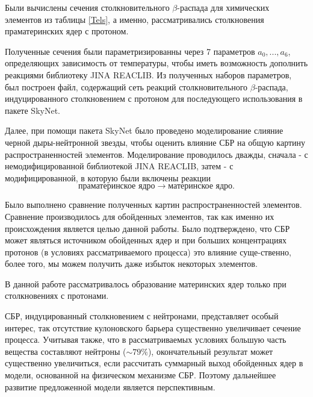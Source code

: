 \documentclass[14pt, a4paper]{article}
\begin{document}
Были вычислены сечения столкновительного $\beta$-распада для химических элементов из таблицы \ref{Tels}, а именно, рассматривались столкновения праматеринских ядер с протоном. 

Полученные сечения были параметризированны через 7 параметров $a_0, ..., a_6$, определяющих зависимость от температуры, чтобы иметь возможность дополнить реакциями библиотеку JINA REACLIB. Из полученных наборов параметров, был построен файл, содержащий сеть реакций столкновительного $\beta$-распада, индуцированного столкновением с протоном для последующего использования в пакете SkyNet.


Далее, при помощи пакета SkyNet было проведено моделирование слияние черной дыры-нейтронной звезды, чтобы оценить влияние СБР на общую картину распространенностей элементов. Моделирование проводилось дважды, сначала - с немодифицированной библиотекой JINA REACLIB, затем - с модифицированной, в которую были включены реакции $$\text{праматеринское ядро} \to \text{материнское ядро}.$$

Было выполнено сравнение полученных картин распространенностей элементов.  Сравнение производилось для обойденных элементов, так как именно их происхождения является целью данной работы. Было подтверждено, что СБР может являться источником обойденных ядер и при больших концентрациях протонов (в условиях рассматриваемого процесса) это влияние суще-ственно, более того, мы можем получить даже избыток некоторых элементов.

В данной работе рассматривалось образование материнских ядер только при столкновениях с протонами. 

СБР, индуцированный столкновением с нейтронами, представляет особый интерес, так отсутствие кулоновского барьера существенно увеличивает сечение процесса. Учитывая также, что в рассматриваемых условиях большую часть вещества составляют нейтроны ($\sim 79\%$), окончательный результат может существенно увеличиться, если рассчитать суммарный выход обойденных ядер в модели, основанной на физическом механизме СБР. Поэтому дальнейшее развитие предложенной модели является перспективным.
\newpage
{}


\end{document}
